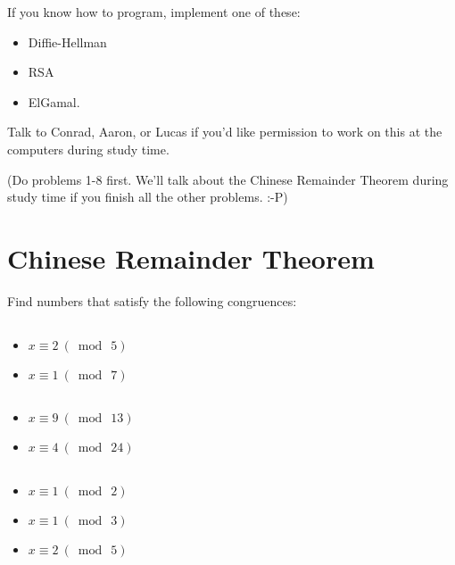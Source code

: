 \documentclass[12pt]{article}
\let\sol=\undefined
\newcommand{\sol}[1]{\begin{proof}\color{red}\textbf[SOLUTION: {#1}]\end{proof}}
\begin{document}
If you know how to program, implement one of these: 

\begin{itemize}
\item Diffie-Hellman
\item RSA
\item ElGamal.
\end{itemize}


Talk to Conrad, Aaron, or Lucas if you'd like permission to work on this at the computers during study time.


\newpage

(Do problems 1-8 first. We'll talk about the Chinese Remainder Theorem during study time if you finish all the other problems. :-P)

\section{Chinese Remainder Theorem}

Find numbers that satisfy the following congruences:

\subsection{}

\begin{itemize}
\item $x \equiv 2 ~(\bmod~5)$
\item $x \equiv 1 ~(\bmod~7)$
\end{itemize}

\sol{22}

\subsection{}

\begin{itemize}
\item $x \equiv 9 ~(\bmod~13)$
\item $x \equiv 4 ~(\bmod~24)$
\end{itemize}

\sol{100}

\subsection{}

\begin{itemize}
\item $x \equiv 1 ~(\bmod~2)$
\item $x \equiv 1 ~(\bmod~3)$
\item $x \equiv 2 ~(\bmod~5)$
\end{itemize}
\end{document}
